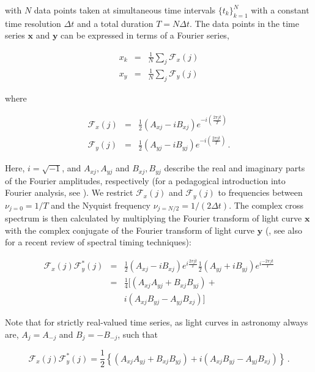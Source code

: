 \documentclass[12pt]{emulateapj}
\begin{document}
\noindent with $N$ data points taken at simultaneous time intervals $\{t_k\}_{k=1}^N$ with a constant time resolution $\Delta t$ and a total duration $T = N\Delta t$. 
The data points in the time series $\mathbf{x}$ and $\mathbf{y}$ can be expressed in terms of a Fourier series,

\begin{eqnarray}
x_k & = & \frac{1}{N} \sum_{j}{\mathcal{F}_x(j)} \nonumber \\
x_y & = & \frac{1}{N} \sum_{j}{\mathcal{F}_y(j)}
\end{eqnarray}

\noindent where

\begin{eqnarray}
\mathcal{F}_x(j) &= & \frac{1}{2} (A_{xj} - i B_{xj}) e^{-i\left( \frac{2 \pi j t}{T} \right)} \\
\mathcal{F}_y(j) &= & \frac{1}{2} (A_{yj} - i B_{yj}) e^{-i\left( \frac{2 \pi j t}{T} \right)} \, .
\end{eqnarray}

\noindent Here, $i = \sqrt{-1}$, and $A_{xj}, A_{yj}$ and $B_{xj}, B_{yj}$ describe the real and imaginary parts of the Fourier amplitudes, respectively (for a pedagogical introduction into Fourier analysis, see \citealt{vanderklis1989}). We restrict $\mathcal{F}_x(j)$ and $\mathcal{F}_y(j)$ to frequencies between $\nu_{j=0} = 1/T$ and the Nyquist frequency $\nu_{j=N/2} = 1/(2\Delta t)$.
The complex cross spectrum is then calculated by multiplying the Fourier transform of light curve $\mathbf{x}$ with the complex conjugate of the Fourier transform of light curve $\mathbf{y}$ (\citealt{vaughan1997,nowak1999}, see also \citealt{uttley2014} for a recent review of spectral timing techniques):

\begin{eqnarray}
\mathcal{F}_x(j) \mathcal{F}_y^*(j) & = & \frac{1}{2} (A_{xj} - i B_{xj}) e^{i \frac{2 \pi j t}{T}} \frac{1}{2} (A_{yj} + i B_{yj}) e^{i \frac{-2 \pi j t}{T}}\nonumber \\ 
		     & = & \frac{1}{4} [ (A_{xj}A_{yj} + B_{xj}B_{yj}) + \\\nonumber
		     & &  i (A_{xj}B_{yj} - A_{yj}B_{xj}) ]
\end{eqnarray}

Note that for strictly real-valued time series, as light curves in astronomy always are, $A_j = A_{-j}$ and $B_j = - B_{-j}$, such that 

\begin{equation}
\mathcal{F}_x(j) \mathcal{F}_y^*(j) = \frac{1}{2} \left\{ (A_{xj}A_{yj} + B_{xj}B_{yj}) + i (A_{xj}B_{yj} - A_{yj}B_{xj}) \right\} \, .
\label{eqn:crossspectrum}
\end{equation}
\end{document}
